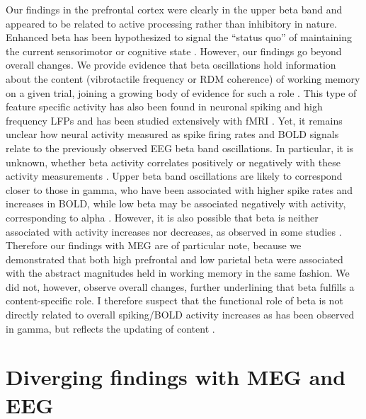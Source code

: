 Our findings in the prefrontal cortex were clearly in the upper beta band and appeared to be related to active processing rather than inhibitory in nature. Enhanced beta has been hypothesized to signal the “status quo” of maintaining the current sensorimotor or cognitive state \parencite{Engel2010}. However, our findings go beyond overall changes. We provide evidence that beta oscillations hold information about the content (vibrotactile frequency or RDM coherence) of working memory on a given trial, joining a growing body of evidence for such a role \parencite{Spitzer2010,Spitzer2011,Wimmer2016}. This type of feature specific activity has also been found in neuronal spiking and high frequency LFPs \parencite{Pesaran2002,Romo1999,Nieder2003} and has been studied extensively with fMRI \parencite{Christophel2012,Christophel2017,Uluc2018,Wu2018}. Yet, it remains unclear how neural activity measured as spike firing rates and BOLD signals relate to the previously observed EEG beta band oscillations. In particular,  it is unknown, whether beta activity correlates positively or negatively with these activity measurements \parencite{Spitzer2017}. Upper beta band oscillations are likely to correspond closer to those in gamma, who have been associated with higher spike rates and increases in BOLD, while low beta may be associated negatively with activity, corresponding to alpha \parencite{Michels2010,Hanslmayr2011}. However, it is also possible that beta is neither associated with activity increases nor decreases, as observed in some studies \parencite{Rule2017, Whittingstall2009}. Therefore our findings with MEG are of particular note, because we demonstrated that both high prefrontal and low parietal beta were associated with the abstract magnitudes held in working memory in the same fashion. We did not, however, observe overall changes, further underlining that beta fulfills a content-specific role. I therefore suspect that the functional role of beta is not directly related to overall spiking/BOLD activity increases as has been observed in gamma, but reflects the updating of content \parencite{Spitzer2017}.

\section{Diverging findings with MEG and EEG}

